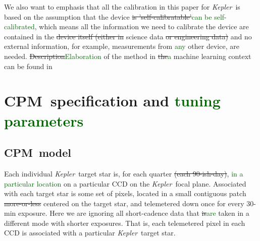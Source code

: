 \documentclass[12pt, preprint]{aastex}
\newcommand{\project}[1]{\textsl{#1}}
\newcommand{\Kepler}{\project{Kepler}}
\newcommand{\name}{CPM}
\newcommand{\revise}[1]{\textcolor{darkgreen}{#1}}
\newcommand{\remove}[1]{\sout{#1}}
\begin{document}
We also want to emphasis that all the calibration in this paper for \Kepler\ is 
  based on the assumption that the device \remove{is 'self-calibratable'}\revise{can be self-calibrated}, 
  which means all the information we need to calibrate the device are contained in the \remove{device itself 
  (either in} science data \remove{or engineering data)} and no external information, 
  for example, measurements from \revise{any} other device, are needed.
\remove{Description}\revise{Elaboration} of the method in \remove{the}\revise{a} machine learning context can be found in \citealt{icml2015}

\section{\name\ specification and \revise{tuning parameters}}
\subsection{\name\ model}
Each individual \Kepler\ target star is, for each quarter \remove{(each 90-ish-day)},
  \revise{in a particular location} on a particular CCD on the \Kepler\ focal plane.
Associated with each target star is some set of pixels,
  located in a small contiguous patch \remove{more-or-less} centered on the target star,
  and telemetered down once for every 30-min exposure.
Here we are ignoring all short-cadence data that \remove{is}\revise{are} taken in a different mode with shorter exposures.
That is, each telemetered pixel in each CCD is associated with a particular \Kepler\ target star.
\end{document}
